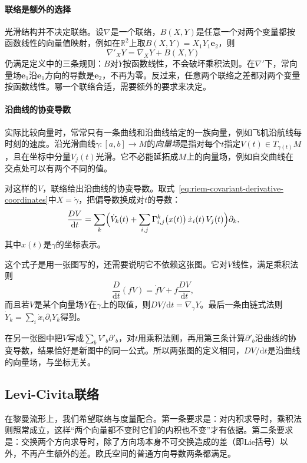 \paragraph{联络是额外的选择}
光滑结构并不决定联络。设$\nabla$是一个联络，$B(X,Y)$是任意一个对两个变量都按函数线性的向量值映射，例如在$\mathbb R^2$上取$B(X,Y)=X_1Y_1\bm e_2$，则
\[
\nabla'_XY=\nabla_XY+B(X,Y)
\]
仍满足定义中的三条规则：$B$对$Y$按函数线性，不会破坏乘积法则。在$\nabla'$下，常向量场$\bm e_1$沿$\bm e_1$方向的导数是$\bm e_2$，不再为零。反过来，任意两个联络之差都对两个变量按函数线性。哪一个联络合适，需要额外的要求来决定。

\paragraph{沿曲线的协变导数}
实际比较向量时，常常只有一条曲线和沿曲线给定的一族向量，例如飞机沿航线每时刻的速度。沿光滑曲线$\gamma:[a,b]\to M$的\emph{向量场}是指对每个$t$指定$V(t)\in T_{\gamma(t)}M$，且在坐标中分量$V_j(t)$光滑。它不必能延拓成$M$上的向量场，例如自交曲线在交点处可以有两个不同的值。

对这样的$V$，联络给出沿曲线的协变导数。取式~\eqref{eq:riem-covariant-derivative-coordinates}中$X=\dot\gamma$，把偏导数换成对$t$的导数：
\begin{equation}
\frac{DV}{\mathrm dt}=\sum_k\Bigl(\dot V_k(t)+\sum_{i,j}\Gamma^k_{i,j}\bigl(x(t)\bigr)\,\dot x_i(t)\,V_j(t)\Bigr)\partial_k ,
\label{eq:riem-covariant-derivative-along-curve}
\end{equation}
其中$x(t)$是$\gamma$的坐标表示。

这个式子是用一张图写的，还需要说明它不依赖这张图。它对$V$线性，满足乘积法则
\[
\frac{D}{\mathrm dt}(fV)=\dot fV+f\frac{DV}{\mathrm dt},
\]
而且若$V$是某个向量场$Y$在$\gamma$上的取值，则$DV/\mathrm dt=\nabla_{\dot\gamma}Y$。最后一条由链式法则$\dot Y_k=\sum_i\dot x_i\partial_iY_k$得到。

在另一张图中把$V$写成$\sum_bV'_b\partial'_b$，对$t$用乘积法则，再用第三条计算$\partial'_b$沿曲线的协变导数，结果恰好是新图中的同一公式。所以两张图的定义相同，$DV/\mathrm dt$是沿曲线的向量场，与坐标无关。

\subsection{Levi-Civita联络}
\label{sec:riem-levi-civita}

在黎曼流形上，我们希望联络与度量配合。第一条要求是：对内积求导时，乘积法则照常成立，这样“两个向量都不变时它们的内积也不变”才有依据。第二条要求是：交换两个方向求导时，除了方向场本身不可交换造成的差（即Lie括号）以外，不再产生额外的差。欧氏空间的普通方向导数两条都满足。

